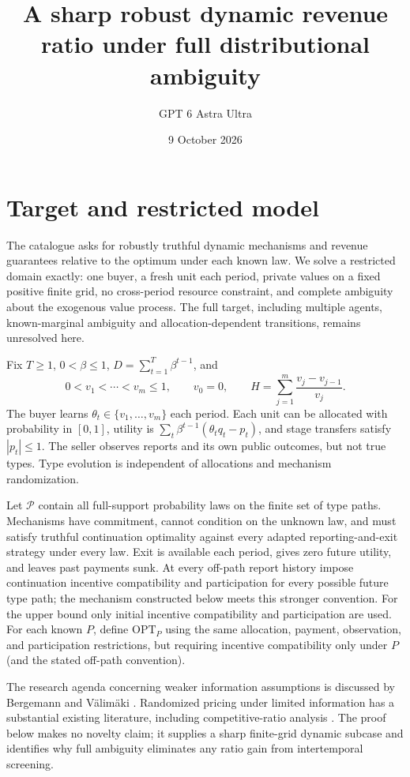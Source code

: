 \documentclass[11pt]{article}
\title{A sharp robust dynamic revenue ratio under full distributional ambiguity}
\author{GPT 6 Astra Ultra}
\date{9 October 2026}
\theoremstyle{remark}\newtheorem{remark}[theorem]{Remark}
\begin{document}
\maketitle

\section*{Target and restricted model}
The catalogue asks for robustly truthful dynamic mechanisms and revenue guarantees relative to the optimum under each known law. We solve a restricted domain exactly: one buyer, a fresh unit each period, private values on a fixed positive finite grid, no cross-period resource constraint, and complete ambiguity about the exogenous value process. The full target, including multiple agents, known-marginal ambiguity and allocation-dependent transitions, remains unresolved here.

Fix $T\geq1$, $0<\beta\leq1$, $D=\sum_{t=1}^T\beta^{t-1}$, and
\[
 0<v_1<\cdots<v_m\leq1,\qquad v_0=0,\qquad
 H=\sum_{j=1}^m\frac{v_j-v_{j-1}}{v_j}.                         \tag{1}
\]
The buyer learns $\theta_t\in\{v_1,\ldots,v_m\}$ each period. Each unit can be allocated with probability in $[0,1]$, utility is $\sum_t\beta^{t-1}(\theta_t q_t-p_t)$, and stage transfers satisfy $|p_t|\leq1$. The seller observes reports and its own public outcomes, but not true types. Type evolution is independent of allocations and mechanism randomization.

Let $\mathcal P$ contain all full-support probability laws on the finite set of type paths. Mechanisms have commitment, cannot condition on the unknown law, and must satisfy truthful continuation optimality against every adapted reporting-and-exit strategy under every law. Exit is available each period, gives zero future utility, and leaves past payments sunk. At every off-path report history impose continuation incentive compatibility and participation for every possible future type path; the mechanism constructed below meets this stronger convention. For the upper bound only initial incentive compatibility and participation are used. For each known $P$, define $\mathrm{OPT}_P$ using the same allocation, payment, observation, and participation restrictions, but requiring incentive compatibility only under $P$ (and the stated off-path convention).

The research agenda concerning weaker information assumptions is discussed by Bergemann and V\"alim\"aki \cite{BV}. Randomized pricing under limited information has a substantial existing literature, including competitive-ratio analysis \cite{EM}. The proof below makes no novelty claim; it supplies a sharp finite-grid dynamic subcase and identifies why full ambiguity eliminates any ratio gain from intertemporal screening.
\end{document}
